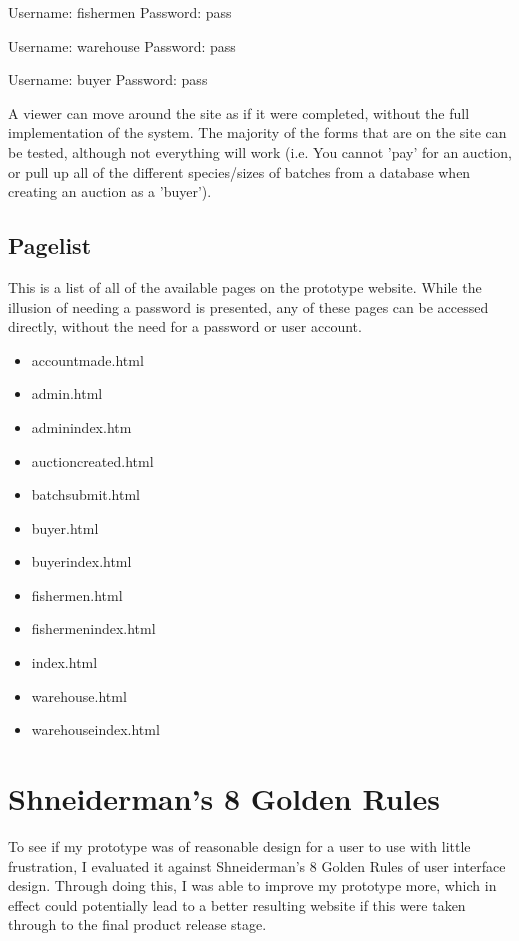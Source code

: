 \documentclass{article}
\begin{document}
Username: fishermen
Password: pass

Username: warehouse
Password: pass

Username: buyer
Password: pass

A viewer can move around the site as if it were completed, without the full implementation of the system. The majority of the forms that are on the site can be tested, although not everything will work (i.e. You cannot 'pay' for an auction, or pull up all of the different species/sizes of batches from a database when creating an auction as a 'buyer').

\subsection{Pagelist}
This is a list of all of the available pages on the prototype website. While the illusion of needing a password is presented, any of these pages can be accessed directly, without the need for a password or user account.
\begin{itemize}
	\item{accountmade.html}
\item{admin.html}
\item{adminindex.htm}
\item{auctioncreated.html}
\item{batchsubmit.html}
\item{buyer.html}
\item{buyerindex.html}
\item{fishermen.html}
\item{fishermenindex.html}
\item{index.html}
\item{warehouse.html}
\item{warehouseindex.html}
\end{itemize}


\section{Shneiderman’s 8 Golden Rules}
To see if my prototype was of reasonable design for a user to use with little frustration, I evaluated it against Shneiderman's 8 Golden Rules of user interface design. Through doing this, I was able to improve my prototype more, which in effect could potentially lead to a better resulting website if this were taken through to the final product release stage.
\end{document}
